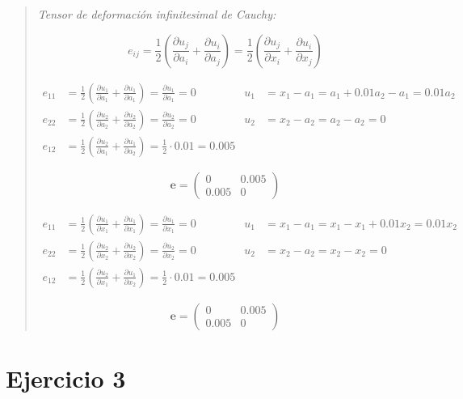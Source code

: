 \documentclass[a4paper,10pt,twoside,final,spanish]{article}
\begin{document}
\begin{quote}
\textit{Tensor de deformación infinitesimal de Cauchy:}

\[
e_{ij}=\frac{1}{2}\left(
\frac{\partial u_{j}}{\partial a_{i}}+
\frac{\partial u_{i}}{\partial a_{j}}
\right)
=
\frac{1}{2}\left(
\frac{\partial u_{j}}{\partial x_{i}}+
\frac{\partial u_{i}}{\partial x_{j}}
\right)
\]

\begin{align*}
e_{11} &= \frac{1}{2}\left(
\frac{\partial u_{1}}{\partial a_{1}}+
\frac{\partial u_{1}}{\partial a_{1}}
\right)
=
\frac{\partial u_{1}}{\partial a_{1}}=0 &
u_{1} &= x_{1}-a_{1}=a_{1}+0.01a_{2}-a_{1}=0.01a_{2} \\
e_{22} &= \frac{1}{2}\left(
\frac{\partial u_{2}}{\partial a_{2}}+
\frac{\partial u_{2}}{\partial a_{2}}
\right)
=
\frac{\partial u_{2}}{\partial a_{2}}=0 &
u_{2} &= x_{2}-a_{2}=a_{2}-a_{2}=0 \\
e_{12} &= \frac{1}{2}\left(
\frac{\partial u_{2}}{\partial a_{1}}+
\frac{\partial u_{1}}{\partial a_{2}}
\right)
=
\frac{1}{2}\cdot0.01=0.005 &
\end{align*}

\[
\mathbf{e}=
\begin{pmatrix}
0 & 0.005 \\
0.005 & 0
\end{pmatrix}
\]

\begin{align*}
e_{11} &= \frac{1}{2}\left(
\frac{\partial u_{1}}{\partial x_{1}}+
\frac{\partial u_{1}}{\partial x_{1}}
\right)
=
\frac{\partial u_{1}}{\partial x_{1}}=0 &
u_{1} &= x_{1}-a_{1}=x_{1}-x_{1}+0.01x_{2}=0.01x_{2} \\
e_{22} &= \frac{1}{2}\left(
\frac{\partial u_{2}}{\partial x_{2}}+
\frac{\partial u_{2}}{\partial x_{2}}
\right)
=
\frac{\partial u_{2}}{\partial x_{2}}=0 &
u_{2} &= x_{2}-a_{2}=x_{2}-x_{2}=0 \\
e_{12} &= \frac{1}{2}\left(
\frac{\partial u_{2}}{\partial x_{1}}+
\frac{\partial u_{1}}{\partial x_{2}}
\right)
=
\frac{1}{2}\cdot0.01=0.005
\end{align*}

\[
\mathbf{e}=
\begin{pmatrix}
0 & 0.005 \\
0.005 & 0
\end{pmatrix}
\]
\end{quote}

\section*{Ejercicio 3}
\end{document}

